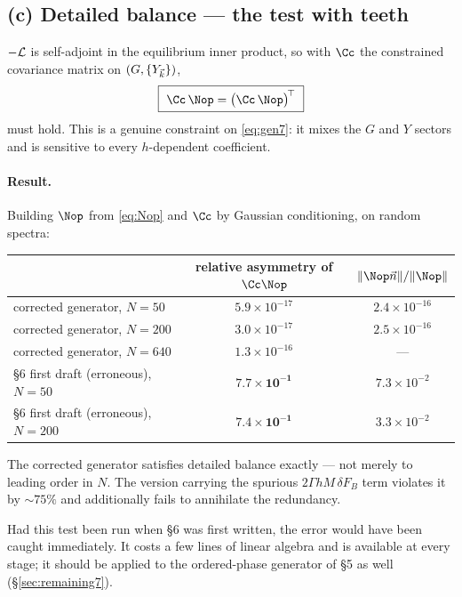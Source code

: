 \subsection{(c) Detailed balance --- the test with teeth}
$-\mathcal{L}$ is self-adjoint in the equilibrium inner product, so with $\Cc$ the constrained
covariance matrix on $(G,\{Y_{\vec k}\})$,
\begin{equation}
  \boxed{\ \Cc\,\Nop=\big(\Cc\,\Nop\big)^{\!\top}\ }
\end{equation}
must hold. This is a genuine constraint on \eqref{eq:gen7}: it mixes the $G$ and
$Y$ sectors and is sensitive to every $h$-dependent coefficient.

\paragraph{Result.} Building $\Nop$ from \eqref{eq:Nop} and $\Cc$ by Gaussian conditioning,
on random spectra:
\begin{center}
\begin{tabular}{lcc}
\hline
 & relative asymmetry of $\Cc\Nop$ & $\|\Nop\vec n\|/\|\Nop\|$\\
\hline
corrected generator, $N=50$   & $5.9\times10^{-17}$ & $2.4\times10^{-16}$\\
corrected generator, $N=200$  & $3.0\times10^{-17}$ & $2.5\times10^{-16}$\\
corrected generator, $N=640$  & $1.3\times10^{-16}$ & --- \\
\rowcolor{gray!12}
\S6 first draft (erroneous), $N=50$  & $\mathbf{7.7\times10^{-1}}$ & $7.3\times10^{-2}$\\
\rowcolor{gray!12}
\S6 first draft (erroneous), $N=200$ & $\mathbf{7.4\times10^{-1}}$ & $3.3\times10^{-2}$\\
\hline
\end{tabular}
\end{center}
The corrected generator satisfies detailed balance exactly --- not merely to leading order
in $N$. The version carrying the spurious $2\Gamma hM\,\delta F_B$ term violates it by
$\sim75\%$ and additionally fails to annihilate the redundancy.

 Had this test been run when \S6 was first written, the error
would have been caught immediately. It costs a few lines of linear algebra and is available
at every stage; it should be applied to the ordered-phase generator of \S5 as well
(\S\ref{sec:remaining7}).

